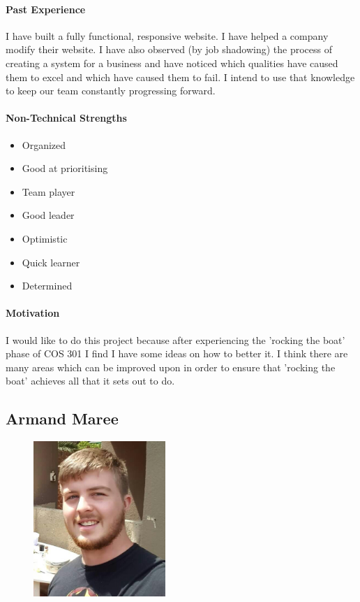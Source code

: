 \documentclass[english]{article}
\begin{document}
			\paragraph{Past Experience}
			I have built a fully functional, responsive website. I have helped a company modify their website. I have also observed (by job shadowing) the process of creating a system for a business and have noticed which qualities have caused them to excel and which have caused them to fail. I intend to use that knowledge to keep our team constantly progressing forward.
			
			\paragraph{Non-Technical Strengths}
			\begin{itemize}
				\setlength\itemsep{0.2em}
			        \item Organized
			        \item Good at prioritising 
			        \item Team player
			        \item Good leader
			        \item Optimistic
			        \item Quick learner
			        \item Determined
			\end{itemize}
			
			\paragraph{Motivation}
			I would like to do this project because after experiencing the 'rocking the boat' phase of COS 301 I find I have some ideas on how to better it. I think there are many areas which can be improved upon in order to ensure that 'rocking the boat' achieves all that it sets out to do.
		
		\newpage
		\subsection{Armand Maree}
			\begin{figure}
				\begin{center}
					\includegraphics[width=5cm]{armand.jpg}
				\end{center}
			\end{figure}
\end{document}
